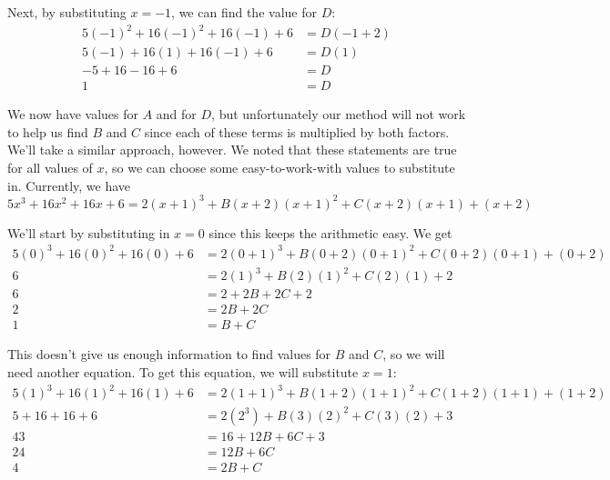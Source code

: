 {Next, by substituting $x=-1$, we can find the value for $D$:
\begin{equation*}
	\begin{split}
		5(-1)^2+16(-1)^2 + 16(-1)+6 & = D(-1+2) \\
		5(-1) + 16(1) + 16(-1) + 6 &= D(1) \\
		-5+16-16+6 & = D \\
		1 & = D
	\end{split}
\end{equation*}

We now have values for $A$ and for $D$, but unfortunately our method will not work to help us find $B$ and $C$ since each of these terms is multiplied by both factors. We'll take a similar approach, however. We noted that these statements are true for all values of $x$, so we can choose some easy-to-work-with values to substitute in. Currently, we have
\begin{equation*}
	5x^3+16x^2+16x+6 = 2(x+1)^3 + B(x+2)(x+1)^2 + C(x+2)(x+1) + (x+2)
\end{equation*}

\noindent
We'll start by substituting in $x=0$ since this keeps the arithmetic easy. We get
\begin{equation*}
	\begin{split}
		5(0)^3 + 16(0)^2 + 16(0) + 6 &= 2(0+1)^3 + B(0+2)(0+1)^2 + C(0+2)(0+1) + (0+2) \\
		6 & = 2(1)^3 + B(2)(1)^2 + C(2)(1) + 2 \\
		6 & = 2 +2B + 2C + 2 \\
		2 &= 2B + 2C \\
		1 & = B + C
	\end{split}
\end{equation*}

This doesn't give us enough information to find values for $B$ and $C$, so we will need another equation. To get this equation, we will substitute $x=1$:
\begin{equation*}
	\begin{split}
		5(1)^3 + 16(1)^2 + 16(1) + 6 & = 2(1+1)^3 + B(1+2)(1+1)^2 + C(1+2)(1+1) + (1+2) \\
		5+16+16+6 & = 2(2^3) + B(3)(2)^2 + C(3)(2) + 3 \\
		43 & = 16 + 12B + 6C + 3 \\
		24 & = 12B + 6C \\
		4 & = 2B + C
	\end{split}
\end{equation*}

}
